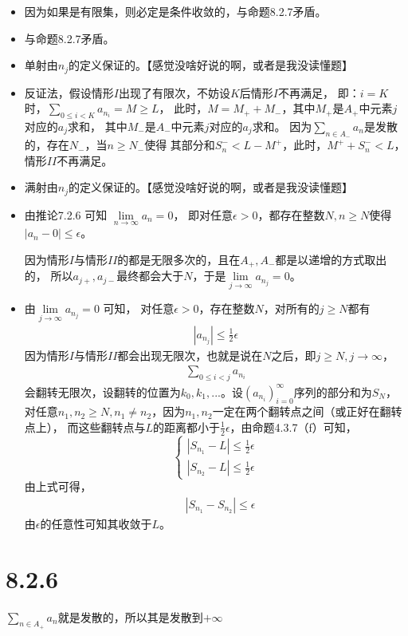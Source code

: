 \documentclass{article}
\begin{document}
\begin{itemize}
  \item 因为如果是有限集，则必定是条件收敛的，与命题8.2.7矛盾。
  \item 与命题8.2.7矛盾。
  \item 单射由$n_j$的定义保证的。【感觉没啥好说的啊，或者是我没读懂题】
  \item 反证法，假设情形$I$出现了有限次，不妨设$K$后情形$I$不再满足，
        即：$i = K$时，$\sum \limits_{0 \leq i < K} a_{n_i} = M \geq L$，
        此时，$M = M_{+} + M_{-}$，其中$M_{+}$是$A_{+}$中元素$j$对应的$a_j$求和，
        其中$M_{-}$是$A_{-}$中元素$j$对应的$a_j$求和。
        因为$\sum \limits_{n \in A_{-}} a_{n}$是发散的，存在$N_{-}$，当$n \geq N_{-}$使得
        其部分和$S_{n}^{-} < L - M^{+}$，此时，$M^{+} + S_{n}^{-} < L$，情形$II$不再满足。
  \item 满射由$n_j$的定义保证的。【感觉没啥好说的啊，或者是我没读懂题】
  \item 由推论7.2.6 可知 $\lim \limits_{n \rightarrow \infty} a_n = 0$，
        即对任意$\epsilon > 0$，都存在整数$N, n \geq N$使得$|a_n - 0| \leq \epsilon$。

        因为情形$I$与情形$II$的都是无限多次的，且在$A_{+},A_{-}$都是以递增的方式取出的，
        所以$a_{j+}, a_{j-}$最终都会大于$N$，于是$\lim \limits_{j \rightarrow \infty} a_{n_j} = 0$。
  \item 由$\lim \limits_{j \rightarrow \infty} a_{n_j} = 0$ 可知，
        对任意$\epsilon > 0$，存在整数$N$，对所有的$j \geq N$都有
        \begin{align*}
          |a_{n_j}| \leq \frac{1}{2} \epsilon
        \end{align*}
        因为情形$I$与情形$II$都会出现无限次，也就是说在$N$之后，即$j \geq N, j \rightarrow \infty$，
        \begin{align*}
          \sum \limits_{0 \leq i < j} a_{n_i}
        \end{align*}
        会翻转无限次，设翻转的位置为$k_0,k_1,...$。设$(a_{n_i})_{i=0}^\infty$序列的部分和为$S_N$，
        对任意$n_1, n_2 \geq N, n_1 \neq n_2$，因为$n_1, n_2$一定在两个翻转点之间（或正好在翻转点上），
        而这些翻转点与$L$的距离都小于$\frac{1}{2}\epsilon$，由命题4.3.7（f）可知，
        \begin{equation*}
          \begin{cases*}
            |S_{n_1} - L| \leq \frac{1}{2} \epsilon \\
            |S_{n_2} - L| \leq \frac{1}{2} \epsilon
          \end{cases*}
        \end{equation*}
        由上式可得，
        \begin{align*}
           & |S_{n_1} - S_{n_2}| \leq \epsilon
        \end{align*}
        由$\epsilon$的任意性可知其收敛于$L$。
\end{itemize}

\section*{8.2.6}

$\sum \limits_{n \in A_{+}} a_n$就是发散的，所以其是发散到$+\infty$
\end{document}
